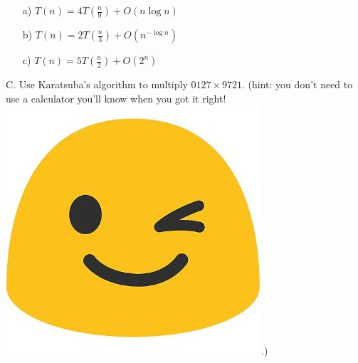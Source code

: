 \documentclass[12pt]{article}
\begin{document}
\begin{enumerate}
    \item[a)]$T(n) = 4T(\frac{n}{9}) + O(n \log{n})$
    \item[b)]$T(n) = 2T(\frac{n}{3}) + O(n^{-\log{n}})$
    \item[c)]$T(n) = 5T(\frac{n}{2}) + O(2^n)$
\end{enumerate}
\newpage
\noindent C. Use Karatsuba's algorithm to multiply $0127\times9721$. (hint: you don't need to use a calculator you'll know when you got it right! \includegraphics[scale = 0.05]{wink.jpg}.)
\end{document}
